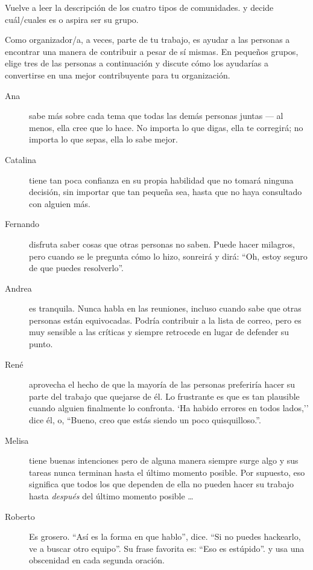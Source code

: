 
Vuelve a leer la descripción de los cuatro tipos de comunidades.
y decide cuál/cuales es o aspira ser su grupo.


Como organizador/a,
a veces, parte de tu trabajo, es ayudar a las personas a encontrar una manera de contribuir a pesar de sí mismas.
En pequeños grupos,
elige tres de las personas a continuación
y discute cómo los ayudarías a convertirse en una mejor contribuyente para tu organización.

\begin{description}

\item[Ana]
  sabe más sobre cada tema que todas las demás personas juntas --- al menos,
  ella cree que lo hace.
  No importa lo que digas,
  ella te corregirá;
  no importa lo que sepas, ella lo sabe mejor.
	
\item[Catalina]
  tiene tan poca confianza en su propia habilidad
  que no tomará ninguna decisión,
  sin importar que tan pequeña sea,
  hasta que no haya consultado con alguien más.

\item[Fernando]
  disfruta saber cosas que otras personas no saben.
  Puede hacer milagros,
  pero cuando se le pregunta cómo lo hizo,
  sonreirá y dirá:
  ``Oh, estoy seguro de que puedes resolverlo''.

\item[Andrea]
  es tranquila.
  Nunca habla en las reuniones,
  incluso cuando sabe que otras personas están equivocadas.
  Podría contribuir a la lista de correo,
  pero es muy sensible a las críticas
  y siempre retrocede en lugar de defender su punto.

\item[René]
  aprovecha el hecho de que la mayoría de las personas preferiría hacer su parte del trabajo
  que quejarse de él.
  Lo frustrante es que es tan plausible cuando alguien finalmente lo confronta.
  `Ha habido errores en todos lados,''
  dice él,
  o, ``Bueno, creo que estás siendo un poco quisquilloso.''.

\item[Melisa]
  tiene buenas intenciones
  pero de alguna manera siempre surge algo
  y sus tareas nunca terminan hasta el último momento posible.
  Por supuesto,
  eso significa que todos los que dependen de ella no pueden hacer su trabajo
  hasta \emph{después} del último momento posible {\ldots}
  
\item[Roberto]
  Es grosero.
  ``Así es la forma en que hablo'', dice.
  ``Si no puedes hackearlo, ve a buscar otro equipo''.
  Su frase favorita es: ``Eso es estúpido''.
  y usa una obscenidad en cada segunda oración.

\end{description}

